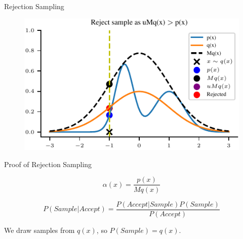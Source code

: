 \documentclass[handout]{beamer}
\begin{document}
    \begin{frame}{Rejection Sampling}
        \begin{figure}
            \centering
            \includegraphics{notebooks/figures/sampling/rejection-sampling--1.0-True-True-True-True-True-True-True-True.pdf}
        \end{figure}
    \end{frame}

        
    
    \begin{frame}{Proof of Rejection Sampling}
        \begin{tcolorbox}[colback=metropolisblue!5,colframe=metropolisblue,title={Acceptance Probability $\alpha(x)$}]
            \begin{equation}
              \alpha(x) = \frac{p(x)}{M q(x)}
            \end{equation}
    \end{tcolorbox}
       
    \begin{tcolorbox}[colback=metropolisblue!5,colframe=metropolisblue,title={Bayes Rule for Acceptance}]
        \begin{equation}
            P(Sample|Accept) = \frac{P(Accept|Sample) P(Sample)}{P(Accept)}
        \end{equation}
\end{tcolorbox}

\begin{tcolorbox}[colback=metropolisblue!5,colframe=metropolisblue,title={P(Sample)}]
    We draw samples from $q(x)$, so $P(Sample) = q(x)$.
\end{tcolorbox}
\end{frame}
\end{document}
